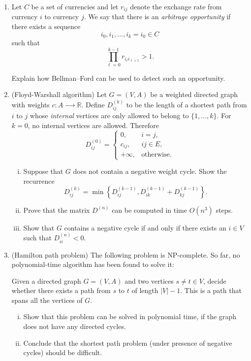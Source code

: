 \documentclass[11pt]{article}
\institute{\'Ecole Polytechnique F\'ed\'erale de Lausanne}
\begin{document}
\makeheader

\begin{enumerate}[1)]


\item \label{arbitrage} Let \(C\) be a set of currencies and let \(r_{ij}\) denote the exchange
rate from currency \(i\) to currency \(j\). We say that there is an
\emph{arbitrage opportunity} if there exists a sequence 
\[
i_0,i_1,\ldots,i_k=i_0 ∈ C
\]
such that
\[
\prod_{\ell=0}^{k-1} r_{i_\ell i_{\ell+1}}>1.
\]

 Explain how Bellman--Ford can be used
 to detect such an opportunity.

\item \label{Floyd} (Floyd-Warshall algorithm) Let $G = (V,A)$ be a weighted directed graph with weights $c: A ⟶ ℝ$.
Define $D^{(k)}_{ij}$ to be the length of a shortest path from \(i\) to \(j\) whose \emph{internal}
vertices are only allowed to belong to $\{1,\dots,k\}$.
For \(k=0\), no internal vertices are allowed. Therefore
\[
D^{(0)}_{ij}
=
\begin{cases}
0, & i=j,\\
c_{ij}, & ij\in E,\\
+\infty, & \text{otherwise.}
\end{cases}
\]

\begin{enumerate}[i)] 
\item
 Suppose that $G$ does not contain a negative weight cycle. 
  Show the recurrence
  \[
    D^{(k)}_{ij}
    =
    \min\left\{
      D^{(k-1)}_{ij},
      D^{(k-1)}_{ik}+D^{(k-1)}_{kj}
    \right\}.
  \]
\item Prove that the matrix $D^{(n)}$ can be computed in time $O(n^3)$ steps.
\item  Show that $G$ contains a negative cycle if and only if there exists an $i ∈V$ such that $D^{(n)}_{ii} <0$. 
\end{enumerate}
\item \label{hamilton} (Hamilton path problem) The following problem is NP-complete. So far, no polynomial-time algorithm has been found to solve it:

  Given a directed graph $G = (V,A)$ and two vertices $s≠t ∈ V$, decide whether there exists a path from $s$ to $t$ of length $|V|-1$. This is a path that spans all the vertices of $G$.

  \begin{enumerate}[i)] 
  \item  Show that this problem can be solved in polynomial time, if the graph does not have any directed cycles.
  \item Conclude that the shortest path problem (under presence of negative  cycles) should be difficult. 
  \end{enumerate}


\end{enumerate}
\end{document}
